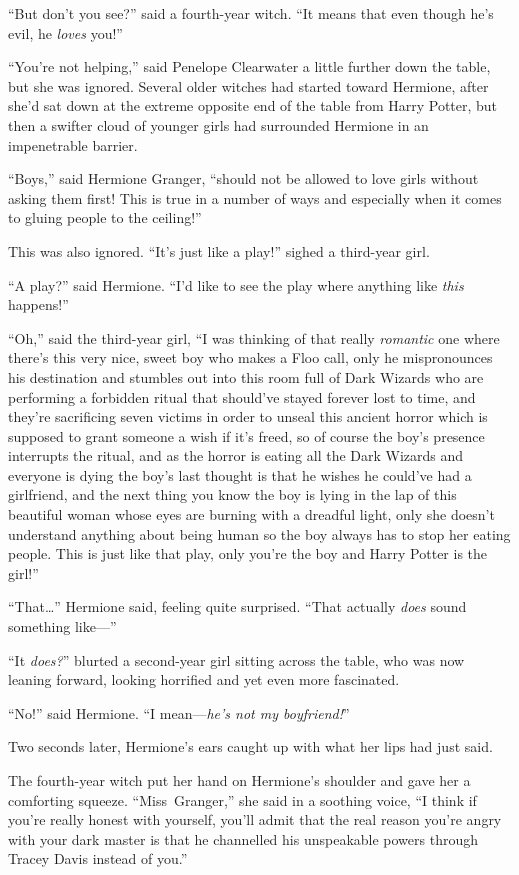“But don’t you see?” said a fourth-year witch. “It means that even though he’s evil, he \emph{loves} you!”

“You’re not helping,” said Penelope Clearwater a little further down the table, but she was ignored. Several older witches had started toward Hermione, after she’d sat down at the extreme opposite end of the table from Harry Potter, but then a swifter cloud of younger girls had surrounded Hermione in an impenetrable barrier.

“Boys,” said Hermione Granger, “should not be allowed to love girls without asking them first! This is true in a number of ways and especially when it comes to gluing people to the ceiling!”

This was also ignored. “It’s just like a play!” sighed a third-year girl.

“A play?” said Hermione. “I’d like to see the play where anything like \emph{this} happens!”

“Oh,” said the third-year girl, “I was thinking of that really \emph{romantic} one where there’s this very nice, sweet boy who makes a Floo call, only he mispronounces his destination and stumbles out into this room full of Dark Wizards who are performing a forbidden ritual that should’ve stayed forever lost to time, and they’re sacrificing seven victims in order to unseal this ancient horror which is supposed to grant someone a wish if it’s freed, so of course the boy’s presence interrupts the ritual, and as the horror is eating all the Dark Wizards and everyone is dying the boy’s last thought is that he wishes he could’ve had a girlfriend, and the next thing you know the boy is lying in the lap of this beautiful woman whose eyes are burning with a dreadful light, only she doesn’t understand anything about being human so the boy always has to stop her eating people. This is just like that play, only you’re the boy and Harry Potter is the girl!”

“That…” Hermione said, feeling quite surprised. “That actually \emph{does} sound something like—”

“It \emph{does?}” blurted a second-year girl sitting across the table, who was now leaning forward, looking horrified and yet even more fascinated.

“No!” said Hermione. “I mean—\emph{he’s not my boyfriend!}”

Two seconds later, Hermione’s ears caught up with what her lips had just said.

The fourth-year witch put her hand on Hermione’s shoulder and gave her a comforting squeeze. “Miss~Granger,” she said in a soothing voice, “I think if you’re really honest with yourself, you’ll admit that the real reason you’re angry with your dark master is that he channelled his unspeakable powers through Tracey Davis instead of you.”


